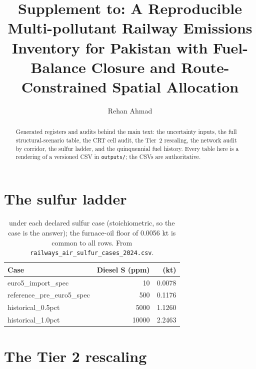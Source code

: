 \documentclass[5p,times,authoryear]{elsarticle}
\begin{document}
\begin{frontmatter}
\title{Supplement to: A Reproducible Multi-pollutant Railway Emissions Inventory for
Pakistan with Fuel-Balance Closure and Route-Constrained Spatial Allocation}
\author[paqi]{Rehan Ahmad}
\address[paqi]{Pakistan Air Quality Initiative (PAQI), Karachi, Pakistan}
\begin{abstract}
Generated registers and audits behind the main text: the uncertainty inputs, the full
structural-scenario table, the CRT cell audit, the Tier~2 rescaling, the network audit by
corridor, the sulfur ladder, and the quinquennial fuel history. Every table here is a
rendering of a versioned CSV in \texttt{outputs/}; the CSVs are authoritative.
\end{abstract}
\end{frontmatter}

\ReleaseCover


\section{The sulfur ladder}
\label{s:sulfur}

\begin{table}[htbp]
\centering
\footnotesize
\begin{tabular}{@{}lrr@{}}
\toprule
\textbf{Case} & \textbf{Diesel S (ppm)} & \textbf{\SOtwo{} (kt)} \\
\midrule
euro5\_import\_spec          &    10 & 0.0078 \\
reference\_pre\_euro5\_spec  &   500 & 0.1176 \\
historical\_0.5pct           &  5000 & 1.1260 \\
historical\_1.0pct           & 10000 & 2.2463 \\
\bottomrule
\end{tabular}
\caption{\SOtwo{} under each declared sulfur case (stoichiometric, so the case is the
answer); the furnace-oil floor of \num{0.0056} kt is common to all rows. From
\texttt{railways\_air\_sulfur\_cases\_2024.csv}.}
\label{tab:sulfur}
\end{table}

\section{The Tier 2 rescaling}
\end{document}
